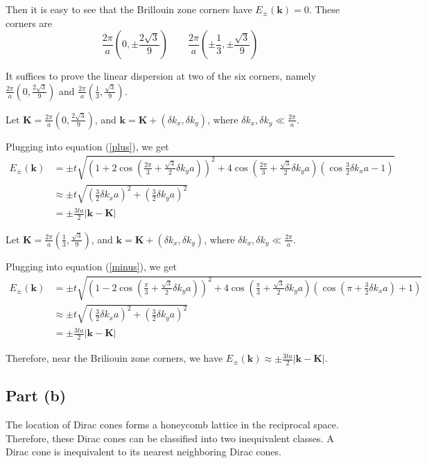 \documentclass{article}
\begin{document}
Then it is easy to see that the Brillouin zone corners have $E_\pm(\mathbf{k})=0$. These corners are
\begin{equation*}
	\frac{2\pi}{a}\left(0,\pm\frac{2\sqrt{3}}{9}\right)\quad\quad\frac{2\pi}{a}\left(\pm\frac{1}{3},\pm\frac{\sqrt{3}}{9}\right)
\end{equation*}

It suffices to prove the linear dispersion at two of the six corners, namely $\frac{2\pi}{a}\left(0,\frac{2\sqrt{3}}{9}\right)$ and $\frac{2\pi}{a}\left(\frac{1}{3},\frac{\sqrt{3}}{9}\right)$.

Let $\mathbf{K}=\frac{2\pi}{a}\left(0,\frac{2\sqrt{3}}{9}\right)$, and $\mathbf{k}=\mathbf{K}+(\delta k_x,\delta k_y)$, where $\delta k_x,\delta k_y\ll\frac{2\pi}{a}$.

Plugging into equation (\ref{plus}), we get
\begin{align*}
	E_\pm(\mathbf{k})&=\pm t\sqrt{\left(1+2\cos\left(\frac{2\pi}{3}+\frac{\sqrt{3}}{2}\delta k_ya\right)\right)^2+4\cos\left(\frac{2\pi}{3}+\frac{\sqrt{3}}{2}\delta k_ya\right)\left(\cos\frac{3}{2}\delta k_xa-1\right)}\\
	&\approx\pm t\sqrt{\left(\frac{3}{2}\delta k_xa\right)^2+\left(\frac{3}{2}\delta k_ya\right)^2}\\
	&=\pm\frac{3ta}{2}|\mathbf{k}-\mathbf{K}|
\end{align*}

Let $\mathbf{K}=\frac{2\pi}{a}\left(\frac{1}{3},\frac{\sqrt{3}}{9}\right)$, and $\mathbf{k}=\mathbf{K}+(\delta k_x,\delta k_y)$, where $\delta k_x,\delta k_y\ll\frac{2\pi}{a}$.

Plugging into equation (\ref{minus}), we get
\begin{align*}
	E_\pm(\mathbf{k})&=\pm t\sqrt{\left(1-2\cos\left(\frac{\pi}{3}+\frac{\sqrt{3}}{2}\delta k_ya\right)\right)^2+4\cos\left(\frac{\pi}{3}+\frac{\sqrt{3}}{2}\delta k_ya\right)\left(\cos\left(\pi+\frac{3}{2}\delta k_xa\right)+1\right)}\\
	&\approx\pm t\sqrt{\left(\frac{3}{2}\delta k_xa\right)^2+\left(\frac{3}{2}\delta k_ya\right)^2}\\
	&=\pm\frac{3ta}{2}|\mathbf{k}-\mathbf{K}|
\end{align*}

Therefore, near the Briliouin zone corners, we have $E_\pm(\mathbf{k})\approx\pm\frac{3ta}{2}|\mathbf{k}-\mathbf{K}|$.

\subsection{Part (b)}
The location of Dirac cones forms a honeycomb lattice in the reciprocal space. Therefore, these Dirac cones can be classified into two inequivalent classes. A Dirac cone is inequivalent to its nearest neighboring Dirac cones.
\end{document}
